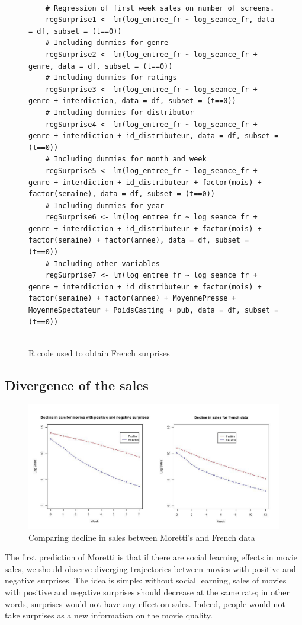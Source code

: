 \begin{figure}[H]
	\caption{R code used to obtain French surprises}
	\
	\begin{lstlisting}
	# Regression of first week sales on number of screens.
	regSurprise1 <- lm(log_entree_fr ~ log_seance_fr, data = df, subset = (t==0))
	# Including dummies for genre
	regSurprise2 <- lm(log_entree_fr ~ log_seance_fr + genre, data = df, subset = (t==0))
	# Including dummies for ratings 
	regSurprise3 <- lm(log_entree_fr ~ log_seance_fr + genre + interdiction, data = df, subset = (t==0))
	# Including dummies for distributor 
	regSurprise4 <- lm(log_entree_fr ~ log_seance_fr + genre + interdiction + id_distributeur, data = df, subset = (t==0))
	# Including dummies for month and week 
	regSurprise5 <- lm(log_entree_fr ~ log_seance_fr + genre + interdiction + id_distributeur + factor(mois) + factor(semaine), data = df, subset = (t==0))
	# Including dummies for year 
	regSurprise6 <- lm(log_entree_fr ~ log_seance_fr + genre + interdiction + id_distributeur + factor(mois) + factor(semaine) + factor(annee), data = df, subset = (t==0))
	# Including other variables
	regSurprise7 <- lm(log_entree_fr ~ log_seance_fr + genre + interdiction + id_distributeur + factor(mois) + factor(semaine) + factor(annee) + MoyennePresse + MoyenneSpectateur + PoidsCasting + pub, data = df, subset = (t==0))
	
	\end{lstlisting}
\end{figure}

\subsection{Divergence of the sales}\label{subsec2.2}

\begin{figure}[H]\centering
	\caption{Comparing decline in sales between Moretti's and French data}
	\label{part2.1_plot_moretti}
	\includegraphics[scale=0.6]{comparison.png}
\end{figure}
The first prediction of Moretti is that if there are social learning effects in movie sales, we should observe diverging trajectories between movies with positive and negative surprises. The idea is simple: without social learning, sales of movies with positive and negative surprises should decrease at the same rate; in other words, surprises would not have any effect on sales. Indeed, people would not take surprises as a new information on the movie quality. 

